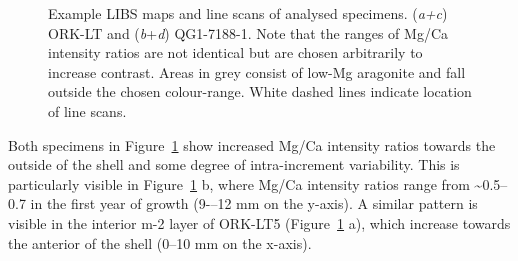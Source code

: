 \documentclass[
  authoryear,
  preprint,
  3p]{elsarticle}
\begin{document}
\begin{figure}[H]


\caption{\label{fig-Pat_LIBS}Example LIBS maps and line scans of
analysed specimens. (\emph{a+c}) ORK-LT and (\emph{b}+\emph{d})
QG1-7188-1. Note that the ranges of Mg/Ca intensity ratios are not
identical but are chosen arbitrarily to increase contrast. Areas in grey
consist of low-Mg aragonite and fall outside the chosen colour-range.
White dashed lines indicate location of line scans.}

\end{figure}%

Both specimens in Figure~\ref{fig-Pat_LIBS} show increased Mg/Ca
intensity ratios towards the outside of the shell and some degree of
intra-increment variability. This is particularly visible in
Figure~\ref{fig-Pat_LIBS} b, where Mg/Ca intensity ratios range from
\textasciitilde0.5--0.7 in the first year of growth (9-\/--12 mm on the
y-axis). A similar pattern is visible in the interior m-2 layer of
ORK-LT5 (Figure~\ref{fig-Pat_LIBS} a), which increase towards the
anterior of the shell (0--10 mm on the x-axis).
\end{document}
